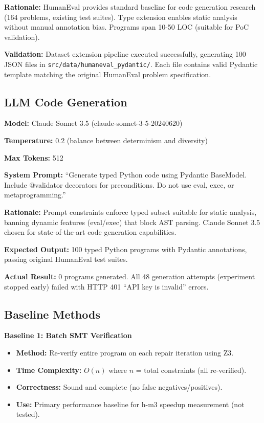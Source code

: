 \textbf{Rationale:} HumanEval provides standard baseline for code generation research (164 problems, existing test suites). Type extension enables static analysis without manual annotation bias. Programs span 10-50 LOC (suitable for PoC validation).

\textbf{Validation:} Dataset extension pipeline executed successfully, generating 100 JSON files in \texttt{src/data/humaneval\_pydantic/}. Each file contains valid Pydantic template matching the original HumanEval problem specification.

\subsection{LLM Code Generation}

\textbf{Model:} Claude Sonnet 3.5 (claude-sonnet-3-5-20240620)

\textbf{Temperature:} 0.2 (balance between determinism and diversity)

\textbf{Max Tokens:} 512

\textbf{System Prompt:} ``Generate typed Python code using Pydantic BaseModel. Include @validator decorators for preconditions. Do not use eval, exec, or metaprogramming.''

\textbf{Rationale:} Prompt constraints enforce typed subset suitable for static analysis, banning dynamic features (eval/exec) that block AST parsing. Claude Sonnet 3.5 chosen for state-of-the-art code generation capabilities.

\textbf{Expected Output:} 100 typed Python programs with Pydantic annotations, passing original HumanEval test suites.

\textbf{Actual Result:} 0 programs generated. All 48 generation attempts (experiment stopped early) failed with HTTP 401 ``API key is invalid'' errors.

\subsection{Baseline Methods}

\textbf{Baseline 1: Batch SMT Verification}
\begin{itemize}
\item \textbf{Method:} Re-verify entire program on each repair iteration using Z3.
\item \textbf{Time Complexity:} $O(n)$ where $n$ = total constraints (all re-verified).
\item \textbf{Correctness:} Sound and complete (no false negatives/positives).
\item \textbf{Use:} Primary performance baseline for h-m3 speedup measurement (not tested).
\end{itemize}

